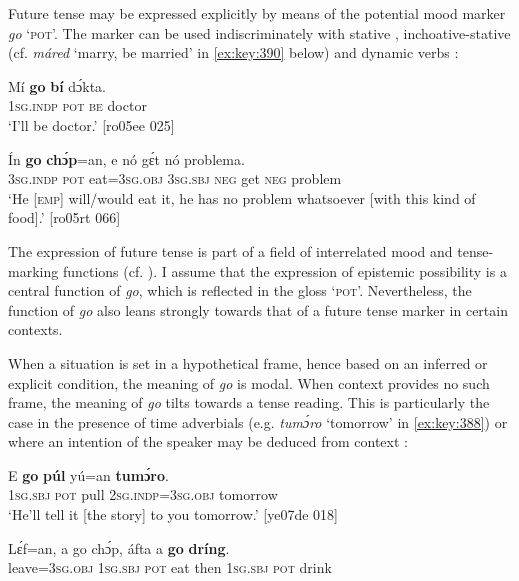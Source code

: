Future tense may be expressed explicitly by means of the potential mood marker \textit{go} \textsc{‘pot’.} The marker can be used indiscriminately with stative , inchoative-stative (cf. \textit{máred} ‘marry, be married’ in \ref{ex:key:390} below) and dynamic verbs :


\ea%
    \label{ex:key:386}
    \gll Mí    \textbf{go}  \textbf{bí}  dɔ́kta.\\
\textsc{1sg.indp}  \textsc{pot}  \textsc{be}  doctor\\

\glt ‘I’ll be doctor.’ [ro05ee 025]
\z


\ea%
    \label{ex:key:387}
    \gll \'{I}n    \textbf{go}  \textbf{chɔ́p}=an,    e    nó  gɛ́t  nó  problema.\\
\textsc{3sg.indp}  \textsc{pot}  eat=\textsc{3sg.obj}  \textsc{3sg.sbj}  \textsc{neg}  get  \textsc{neg}  problem\\

\glt ‘He \textsc{[emp]} will/would eat it, he has no problem whatsoever 
[with this kind of food].’ [ro05rt 066]
\z

The expression of future tense is part of a field of interrelated mood and tense-marking functions (cf. ). I assume that the expression of epistemic possibility is a central function of \textit{go}, which is reflected in the gloss ‘\textsc{pot}’. Nevertheless, the function of \textit{go} also leans strongly towards that of a future tense marker in certain contexts.


When a situation is set in a hypothetical frame, hence based on an inferred or explicit condition, the meaning of \textit{go} is modal. When context provides no such frame, the meaning of \textit{go} tilts towards a tense reading. This is particularly the case in the presence of time adverbials (e.g. \textit{tumɔ́ro} ‘tomorrow’ in \ref{ex:key:388}) or where an intention of the speaker may be deduced from context :



\ea%
    \label{ex:key:388}
    \gll E    \textbf{go} \textbf{púl}  yú=an      \textbf{tumɔ́ro}.\\
\textsc{1sg.sbj}  \textsc{pot}  pull  \textsc{2sg.indp}=\textsc{3sg.obj}  tomorrow\\

\glt ‘He’ll tell it [the story] to you tomorrow.’ [ye07de 018]
\z


\ea%
    \label{ex:key:389}
    \gll Lɛ́f=an,    a    go  chɔ́p,  áfta    a    \textbf{go}  \textbf{dríng}.\\
leave=\textsc{3sg.obj}  \textsc{1sg.sbj}  \textsc{pot}  eat    then  \textsc{1sg.sbj}  \textsc{pot}  drink\\


